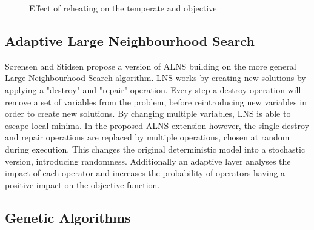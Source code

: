 \begin{figure}[h]
  \centering
  \hfill
  \caption{Effect of reheating on the temperate and objective}
  \label{fig:SAR}
\end{figure}

\subsection{Adaptive Large Neighbourhood Search}

S{\o}rensen and Stidsen \cite{sorensen2012} propose a version of ALNS building on the more general Large Neighbourhood Search algorithm. LNS works by creating new solutions by applying a "destroy" and "repair" operation. Every step a destroy operation will remove a set of variables from the problem, before reintroducing new variables in order to create new solutions. By changing multiple variables, LNS is able to escape local minima. In the proposed ALNS extension however, the single destroy and repair operations are replaced by multiple operations, chosen at random during execution. This changes the original deterministic model into a stochastic version, introducing randomness. Additionally an adaptive layer analyses the impact of each operator and increases the probability of operators having a positive impact on the objective function.

\subsection{Genetic Algorithms}


